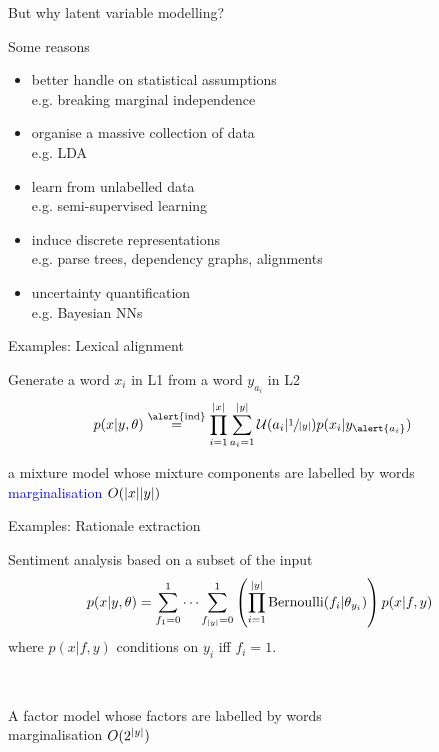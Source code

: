 \begin{frame}{But why latent variable modelling?}

Some reasons

\begin{itemize}
	\item better handle on statistical assumptions\\
	e.g. breaking marginal independence \pause
	\item organise a massive collection of data\\
	e.g. LDA	 \pause
	\item learn from unlabelled data\\
	e.g. semi-supervised learning \pause
	\item induce discrete representations\\
	e.g. parse trees, dependency graphs, alignments \pause
	\item uncertainty quantification\\
	e.g. Bayesian NNs 
\end{itemize}

\end{frame}

\begin{frame}{Examples: Lexical alignment}

Generate a word $x_i$ in L1 from a word $y_{a_i}$ in L2 \pause
	\begin{equation*}
	\begin{aligned}
		p(x|y, \theta) %
		&\overset{\text{\alert{ind}}}{=} \prod_{i=1}^{\abs{x}} \sum_{a_i=1}^{\abs{y}}\mathcal U(a_i|\sfrac{1}{\abs{y}})p(x_i|y_{\alert{a_i}}) 
		\end{aligned}
	\end{equation*}

\pause

a mixture model whose mixture components are labelled by words \hfill \textcolor{blue}{marginalisation $O(\abs{x}\abs{y})$}

\end{frame}

\begin{frame}{Examples: Rationale extraction}

Sentiment analysis based on a subset of the input \pause
\begin{equation*}
	\begin{aligned}
		p(x|y, \theta) &= \sum_{f_1=0}^{1}\cdots \sum_{f_{\abs{y}}=0}^{1} \left( \prod_{i=1}^{\abs{y}} \operatorname{Bernoulli}(f_i|\theta_{y_i}) \right) p(x|f,y)  \\
		\end{aligned}
	\end{equation*}
where $p(x|f,y)$ conditions on $y_i$ iff $f_i = 1$.

~ \pause

A factor model whose factors are labelled by words \\
\hfill \alert{marginalisation $O(2^{\abs{y}})$}

\end{frame}

